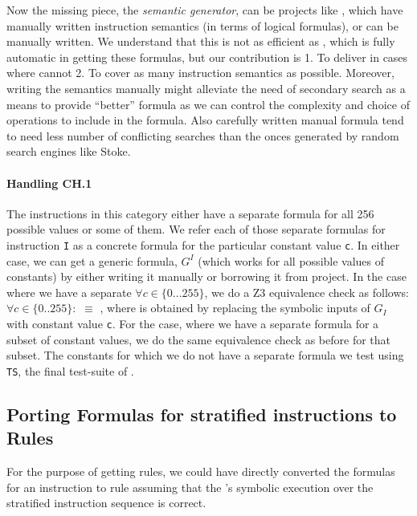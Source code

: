    Now the missing piece, the  \emph{semantic generator}, can be  projects like \Stoke, which have manually written instruction semantics (in terms of logical formulas), or can be manually written.  We understand that this is not as efficient as \Stoke, which is fully automatic in getting these formulas, but our contribution is 1. To deliver in cases where \Stoke cannot   2. To cover  as many instruction semantics as possible. Moreover, writing the semantics manually might alleviate the need of secondary search as a means to provide ``better'' formula as we can control the complexity and choice of operations to include in the formula. Also carefully written manual formula tend to need less number of conflicting searches than the onces generated by random search engines like Stoke.
   
   \paragraph{Handling CH.1}
   The instructions in this category either  have a separate formula for all 256 possible values or some of them. We refer each of those separate formulas for instruction {\tt I} as a concrete formula  for the particular constant value {\tt c}.  
   In either case, we can get a generic formula, $G^I$ (which works for all possible values of constants)  by either writing it manually or borrowing it from  \Stoke project. In the case where we have a separate  $\forall c \in \{0...255\}$, we do a Z3 equivalence check as follows: $\forall c \in \{0..255\}:$  $\equiv$ , where  is obtained by replacing the symbolic inputs of $G_I$ with constant value {\tt c}. For the case, where we have a separate formula for a subset of constant values, we do the same equivalence check as before for that subset. The constants for which we do not have a separate formula we test  using {\tt TS}, the final test-suite of \Strata.   
   
  

\subsection{Porting Formulas for stratified instructions to \K Rules}

For the purpose of getting  \K rules, we could have directly converted the \Strata formulas
for an instruction to \K rule assuming that the \Strata's symbolic execution over the 
stratified instruction sequence is correct.

